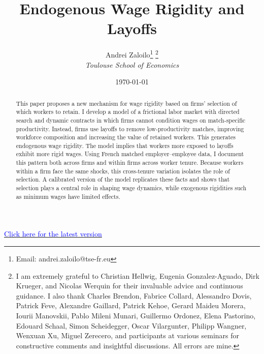 \documentclass[12pt]{article}
\title{\textbf{Endogenous Wage Rigidity and Layoffs}}
\author{Andrei Zaloilo\footnote{Email: andrei.zaloilo@tse-fr.eu} \thanks{I am extremely grateful to Christian Hellwig, Eugenia Gonzalez-Aguado, Dirk Krueger, and Nicolas Werquin for their invaluable advice and continuous guidance. I also thank Charles Brendon, Fabrice Collard, Alessandro Dovis, Patrick Feve, Alexandre Gaillard, Patrick Kehoe, Gerard Maideu Morera, Iourii Manovskii, Pablo Mileni Munari, Guillermo Ordonez, Elena Pastorino, Edouard Schaal, Simon Scheidegger, Oscar Vilargunter, Philipp Wangner, Wenxuan Xu, Miguel Zerecero, and participants at various seminars for constructive comments and insightful discussions. All errors are mine.}\\ \textit{Toulouse School of Economics} }
\date{\today}
\begin{document}
	\begin{titlepage}\maketitle
\vspace{-40pt}
\begin{center}
  \href{https://raw.githack.com/zalandru/Papers/main/Zaloilo%20JMP.pdf}{\textcolor{blue}{Click here for the latest version}}  
\end{center}
\begin{abstract}
This paper proposes a new mechanism for wage rigidity based on firms’ selection of which workers to retain. I develop a model of a frictional labor market with directed search and dynamic contracts in which firms cannot condition wages on match-specific productivity. Instead, firms use layoffs to remove low-productivity matches, improving workforce composition and increasing the value of retained workers. This generates endogenous wage rigidity.
The model implies that workers more exposed to layoffs exhibit more rigid wages. Using French matched employer–employee data, I document this pattern both across firms and within firms across worker tenure. Because workers within a firm face the same shocks, this cross-tenure variation isolates the role of selection. A calibrated version of the model replicates these facts and shows that selection plays a central role in shaping wage dynamics, while exogenous rigidities such as minimum wages have limited effects.



\end{abstract}
\end{titlepage}
\end{document}
